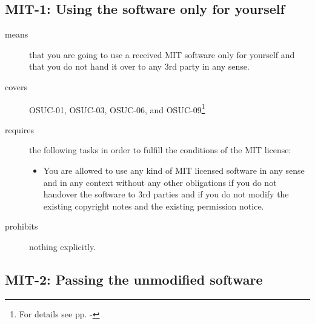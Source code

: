 \begin{center}
\begin{footnotesize}
{{{{{        }


      }
 
    }
   }   
}
\end{footnotesize}
\end{center}

\subsection{MIT-1: Using the software only for yourself}
\label{OSUC-01-MIT} 
\label{OSUC-03-MIT} 
\label{OSUC-06-MIT}
\label{OSUC-09-MIT}
  
\begin{description}
\item[means] that you are going to use a received MIT software only for yourself
and that you do not hand it over to any 3rd party in any sense.
\item[covers] OSUC-01, OSUC-03, OSUC-06, and OSUC-09\footnote{For details see pp.
  \pageref{OSUC-01-DEF} - \pageref{OSUC-09-DEF}}
\item[requires] the following tasks in order to fulfill the conditions
    of the MIT license:
  \begin{itemize}
    \item You are allowed to use any kind of MIT licensed software in any sense
    and in any context without any other obligations if you do not handover the
    software to 3rd parties and if you do not modify the existing copyright
    notes and the existing permission notice.
  \end{itemize}
\item[prohibits] nothing explicitly.
\end{description}

\subsection{MIT-2: Passing the unmodified software}
\label{OSUC-02-MIT} \label{OSUC-05-MIT} \label{OSUC-07-MIT} 

